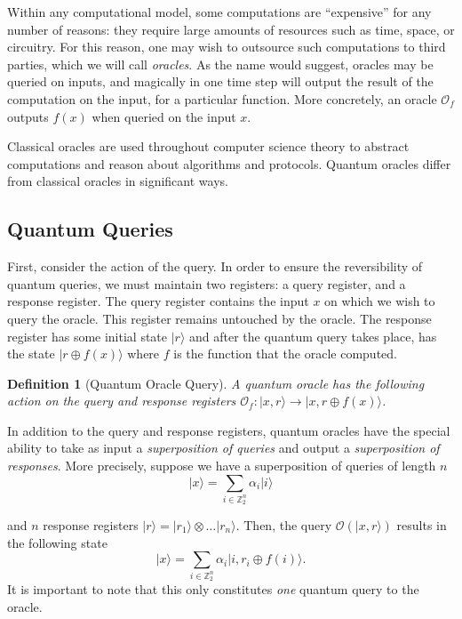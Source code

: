 \documentclass[12pt,twoside]{reedthesis}
\newtheorem{definition}{Definition}
\newcommand{\Z}{\mathbb{Z}}
\newcommand{\ket}[1]{\ensuremath{\lvert #1\rangle}\xspace}
\begin{document}
Within any computational model, some computations are ``expensive'' for any number of reasons: they require large amounts of resources such as time, space, or circuitry. For this reason, one may wish to outsource such computations to third parties, which we will call \textit{oracles}. As the name would suggest, oracles may be queried on inputs, and magically in one time step will output the result of the computation on the input, for a particular function. More concretely, an oracle $\mathcal{O}_f$ outputs $f(x)$ when queried on the input $x$.

Classical oracles are used throughout computer science theory to abstract computations and reason about algorithms and protocols. Quantum oracles differ  from classical oracles in significant ways. 

\subsection{Quantum Queries}
First, consider the action of the query. In order to ensure the reversibility of quantum queries, we must maintain two registers: a query register, and a response register. The query register contains the input $x$ on which we wish to query the oracle. This register remains untouched by the oracle. The response register has some initial state $\ket{r}$ and after the quantum query takes place, has the state $\ket{r\oplus f(x)}$ where $f$ is the function that the oracle computed. 

\begin{definition}[Quantum Oracle Query] A quantum oracle has the following action on the query and response registers $\mathcal{O}_f : \ket{x, r} \rightarrow \ket{x, r \oplus f(x)}$.
\end{definition}

In addition to the query and response registers, quantum oracles have the special ability to take as input a \textit{superposition of queries} and output a \textit{superposition of responses}. More precisely, suppose we have a superposition of queries of length $n$ 
\begin{equation*}
\ket{x} = \sum_{i \in \Z_2^n} \alpha_i \ket{i}
\end{equation*}

and $n$ response registers $\ket{r} = \ket{r_1} \otimes \ldots \ket{r_n}$. Then, the query $\mathcal{O}(\ket{x, r})$ results in the following state
\begin{equation*}
\ket{x} = \sum_{i \in \Z_2^n} \alpha_i \ket{i, r_i \oplus f(i)}.
\end{equation*}
It is important to note that this only constitutes \textit{one} quantum query to the oracle.
\end{document}
